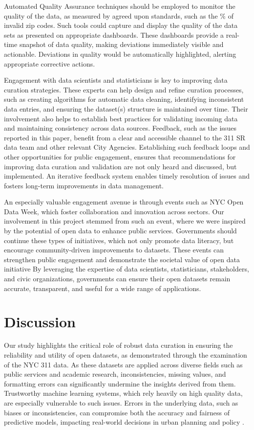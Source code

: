 \documentclass[linenumber]{jdsart}
\begin{document}
Automated Quality Assurance techniques should be employed to 
monitor the quality of the data, as measured by agreed upon
standards, such as the \% of invalid zip codes. Such tools could
capture and display the quality of the data sets as presented
on appropriate dashboards. These dashboards provide a real-time
snapshot of data quality, making deviations immediately visible and
actionable. Deviations in quality would be
automatically highlighted, alerting appropriate corrective actions.


Engagement with data scientists and statisticians is key to improving 
data curation strategies. These experts can help design and refine 
curation processes, such as creating algorithms for automatic data 
cleaning, identifying inconsistent data entries, and ensuring the 
dataset(s) structure is maintained over time. Their involvement also
helps to establish best practices for validating incoming data and
maintaining consistency across data sources.
Feedback, such as the issues reported 
in this paper, benefit from a clear and accessible channel to the 311 SR data 
team and other relevant City Agencies. Establishing such feedback loops 
and other opportunities for public engagement, ensures that 
recommendations for improving data curation and validation 
are not only heard and discussed, but implemented. An iterative
feedback system enables timely resolution of issues and fosters
long-term improvements in data management.


An especially valuable engagement avenue is through events such as NYC 
Open Data Week, which foster collaboration and innovation across sectors. 
Our involvement in this project stemmed from such an event, where we were 
inspired by the potential of open data to enhance public services. Governments 
should continue these types of initiatives, which not only promote 
data literacy, but encourage community-driven improvements to
datasets. These events can strengthen public engagement and
demonstrate the societal value of open data initiative
By leveraging the expertise of data scientists, statisticians, stakeholders, 
and civic organizations, governments can ensure their open datasets 
remain accurate, transparent, and useful for a wide range of applications.


\section{Discussion} 
\label{sec:discussion}
Our study highlights the critical role of robust data curation in
ensuring the reliability and utility of open datasets, as demonstrated
through the examination of the NYC 311 data. As these datasets are
applied across diverse fields such as public services and academic
research, inconsistencies, missing values, and formatting errors can
significantly undermine the insights derived from them. Trustworthy
machine learning systems, which rely heavily on high quality data, are
especially vulnerable to such issues. Errors in the underlying data,
such as biases or inconsistencies, can compromise both the accuracy
and fairness of predictive models, impacting real-world decisions in
urban planning and policy \citep{rahm2000data, geiger2020garbage}.
\end{document}
